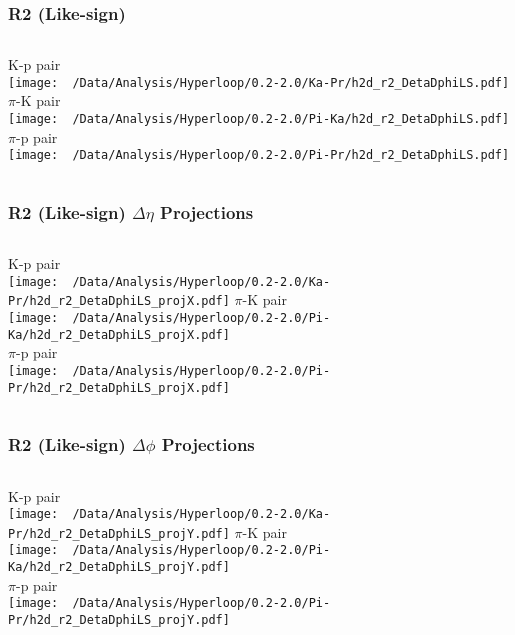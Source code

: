 \documentclass{beamer}
\begin{document}
\begin{frame}
	\frametitle{R2 (Like-sign)}
	\begin{columns}
		\centering
		K-p pair\\
		\texttt{[image: ~/Data/Analysis/Hyperloop/0.2-2.0/Ka-Pr/h2d\_r2\_DetaDphiLS.pdf]}
		\centering
		$\pi$-K pair\\
		\texttt{[image: ~/Data/Analysis/Hyperloop/0.2-2.0/Pi-Ka/h2d\_r2\_DetaDphiLS.pdf]}\\$\pi$-p pair\\
		\texttt{[image: ~/Data/Analysis/Hyperloop/0.2-2.0/Pi-Pr/h2d\_r2\_DetaDphiLS.pdf]}
	\end{columns}
\end{frame}
\begin{frame}
	\frametitle{R2 (Like-sign) $\Delta\eta$ Projections}
	\begin{columns}
		\column{0.5\textwidth}
		\centering
		K-p pair\\
		\texttt{[image: ~/Data/Analysis/Hyperloop/0.2-2.0/Ka-Pr/h2d\_r2\_DetaDphiLS\_projX.pdf]}
		\column{0.5\textwidth}
		\centering
		$\pi$-K pair\\
		\texttt{[image: ~/Data/Analysis/Hyperloop/0.2-2.0/Pi-Ka/h2d\_r2\_DetaDphiLS\_projX.pdf]}\\$\pi$-p pair\\
		\texttt{[image: ~/Data/Analysis/Hyperloop/0.2-2.0/Pi-Pr/h2d\_r2\_DetaDphiLS\_projX.pdf]}
	\end{columns}
\end{frame}
\begin{frame}
	\frametitle{R2 (Like-sign) $\Delta\phi$ Projections}
	\begin{columns}
		\centering
		K-p pair\\
		\texttt{[image: ~/Data/Analysis/Hyperloop/0.2-2.0/Ka-Pr/h2d\_r2\_DetaDphiLS\_projY.pdf]}
		\centering
		$\pi$-K pair\\
		\texttt{[image: ~/Data/Analysis/Hyperloop/0.2-2.0/Pi-Ka/h2d\_r2\_DetaDphiLS\_projY.pdf]}\\$\pi$-p pair\\
		\texttt{[image: ~/Data/Analysis/Hyperloop/0.2-2.0/Pi-Pr/h2d\_r2\_DetaDphiLS\_projY.pdf]}
	\end{columns}
\end{frame}
\end{document}
